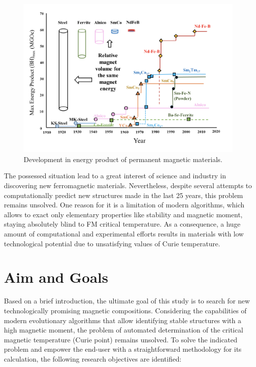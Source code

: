 \begin{figure}[H]
	\centering
	\includegraphics{fig/review/history.png}
	\caption[Development in energy product of permanent magnetic materials]{Development in energy product of permanent magnetic materials.}
	\label{fig:history}
\end{figure}

The possessed situation lead to a great interest of science and industry in discovering new ferromagnetic materials. Nevertheless, despite several attempts to computationally predict new structures made in the last 25 years, this problem remains unsolved. One reason for it is a limitation of modern algorithms, which allows to exact only elementary properties like stability and magnetic moment, staying absolutely blind to FM critical temperature. As a consequence, a huge amount of computational and experimental efforts results in materials with low technological potential due to unsatisfying values of Curie temperature. 


\cleardoublepage
\section{Aim and Goals}


Based on a brief introduction, the ultimate goal of this study is to search for new technologically promising magnetic compositions. Considering the capabilities of modern evolutionary algorithms that allow identifying stable structures with a high magnetic moment, the problem of automated determination of the critical magnetic temperature (Curie point) remains unsolved. To solve the indicated problem and empower the end-user with a straightforward methodology for its calculation, the following research objectives are identified:


